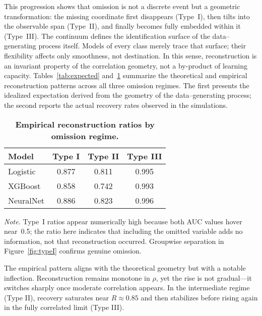 \documentclass[11pt]{article}
\begin{document}
\medskip
This progression shows that omission is not a discrete event but a geometric
transformation: the missing coordinate first disappears (Type~I), then tilts
into the observable span (Type~II), and finally becomes fully embedded within
it (Type~III).  The continuum defines the identification surface of the
data--generating process itself.  Models of every class merely trace that
surface; their flexibility affects only smoothness, not destination.  In this
sense, reconstruction is an invariant property of the correlation geometry,
not a by-product of learning capacity.
Tables~\ref{tab:expected} and~\ref{tab:reconstruction} summarize the
theoretical and empirical reconstruction patterns across all three omission
regimes.  
The first presents the idealized expectation derived from the geometry of the
data–generating process; the second reports the actual recovery rates observed
in the simulations.

\begin{table}[H]
\centering
\caption{\textbf{Empirical reconstruction ratios by omission regime.}}
\begin{tabular}{lccc}
\toprule
\textbf{Model} & \textbf{Type I} & \textbf{Type II} & \textbf{Type III} \\
\midrule
Logistic  & 0.877 & 0.811 & 0.995 \\
XGBoost   & 0.858 & 0.742 & 0.993 \\
NeuralNet & 0.886 & 0.823 & 0.996 \\
\bottomrule
\end{tabular}
\label{tab:reconstruction}
\end{table}

\vspace{-3em}
\begin{center}
{\footnotesize\textit{Note.} 
Type~I ratios appear numerically high because both AUC values hover near~0.5; 
the ratio here indicates that including the omitted variable adds no information, 
not that reconstruction occurred. 
Groupwise separation in Figure~\ref{fig:typeI} confirms genuine omission.}
\end{center}

The empirical pattern aligns with the theoretical geometry but with a notable inflection.
Reconstruction remains monotone in $\rho$, yet the rise is not gradual—it switches sharply once moderate correlation appears.
In the intermediate regime (Type II), recovery saturates near $R\approx0.85$ and then stabilizes before rising again in the fully correlated limit (Type III).
\end{document}
